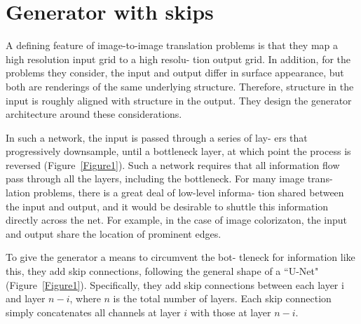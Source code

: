 \documentclass[10pt,twocolumn,letterpaper]{article}
\begin{document}
\section{Generator with skips}
A defining feature of image-to-image translation problems
is that they map a high resolution input grid to a high resolu-
tion output grid. In addition, for the problems they consider,
the input and output differ in surface appearance, but both
are renderings of the same underlying structure. Therefore,
structure in the input is roughly aligned with structure in the
output. They design the generator architecture around these
considerations.
\par In such a network, the input is passed through a series of lay-
ers that progressively downsample, until a bottleneck layer,
at which point the process is reversed (Figure~\ref{Figure1}). Such a
network requires that all information flow pass through all
the layers, including the bottleneck. For many image trans-
lation problems, there is a great deal of low-level informa-
tion shared between the input and output, and it would be desirable to shuttle this information directly across the net.
For example, in the case of image colorizaton, the input and
output share the location of prominent edges.
\par To give the generator a means to circumvent the bot-
tleneck for information like this, they add skip connections,
following the general shape of a ``U-Net"~\cite{name34} (Figure~\ref{Figure1}).
Specifically, they add skip connections between each layer i
and layer $n-i$, where $n$ is the total number of layers. Each
skip connection simply concatenates all channels at layer $i$
with those at layer $n-i$.


\end{document}
